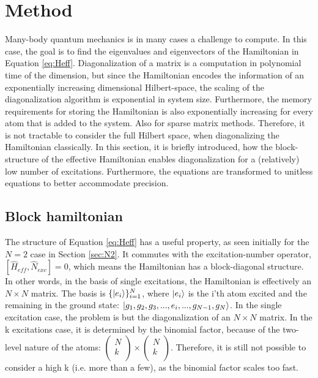 \documentclass{article}
\begin{document}
\section{Method}\label{sec:method}

Many-body quantum mechanics is in many cases a challenge to compute. In this case, the goal is to find the eigenvalues and eigenvectors of the Hamiltonian in Equation \ref{eq:Heff}. Diagonalization of a matrix is a computation in polynomial time of the dimension, but since the Hamiltonian encodes the information of an exponentially increasing dimensional Hilbert-space, the scaling of the diagonalization algorithm is exponential in system size. Furthermore, the memory requirements for storing the Hamiltonian is also exponentially increasing for every atom that is added to the system. Also for sparse matrix methods. Therefore, it is not tractable to consider the full Hilbert space, when diagonalizing the Hamiltonian classically. In this section, it is briefly introduced, how the block-structure of the effective Hamiltonian enables diagonalization for a (relatively) low number of excitations. Furthermore, the equations are transformed to unitless equations to better accommodate precision. 

\subsection{Block hamiltonian}\label{sec:block}

The structure of Equation \ref{eq:Heff} has a useful property, as seen initially for the $N=2$ case in Section \ref{sec:N2}. It commutes with the excitation-number operator, $[\hat{H}_{eff}, \hat{N}_{exc}] = 0$, which means the Hamiltonian has a block-diagonal structure. In other words, in the basis of single excitations, the Hamiltonian is effectively an $N \times N$ matrix. The basis is $\{ \ket{e_i} \}_{i=1}^N$, where $\ket{e_i}$ is the i'th atom excited and the remaining in the ground state: $\ket{g_1, g_2, g_3, ..., e_i, ..., g_{N-1}, g_N}$. In the single excitation case, the problem is but the diagonalization of an $N \times N$ matrix. In the k excitations case, it is determined by the binomial factor, because of the two-level nature of the atoms: $\begin{pmatrix} N \\ k \\ \end{pmatrix} \times \begin{pmatrix} N \\ k \\ \end{pmatrix}$. Therefore, it is still not possible to consider a high k (i.e. more than a few), as the binomial factor scales too fast. 
\end{document}
